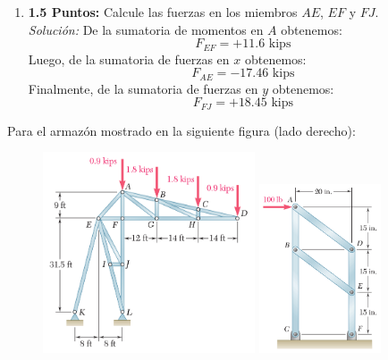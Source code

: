 \documentclass[ a4paper, twoside, 11pt]{article}
\begin{document}
\begin{problem}
\begin{enumerate}[label=\textbf{\alph*)}]
\item \textbf{1.5 Puntos:} Calcule las fuerzas en los miembros $AE$, $EF$ y $FJ$. \\[1ex] \emph{Soluci\'on:} De la sumatoria de momentos en $A$ obtenemos:
\[
F_{EF} = +11.6 \text{ kips}
\]
Luego, de la sumatoria de fuerzas en $x$ obtenemos: 
\[
F_{AE} = -17.46 \text{ kips}
\]
Finalmente, de la sumatoria de fuerzas en $y$ obtenemos: 
\[
F_{FJ} = +18.45 \text{ kips}
\]

\end{enumerate}

\end{problem}
\fullskip

\begin{problem}
Para el armaz\'on mostrado en la siguiente figura (lado derecho):

\begin{figure}[htb]
\centering
\includegraphics[width=0.56\textwidth]{prob-armadura.jpg} \qquad
\includegraphics[width=0.32\textwidth]{prob-armazon.jpg}
\end{figure}


\end{problem}
\end{document}
